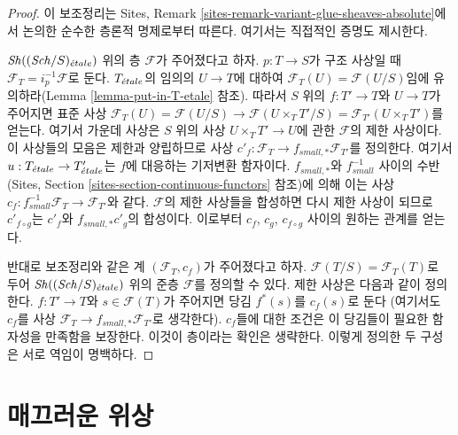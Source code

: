 \begin{proof}
이 보조정리는 Sites, Remark
\ref{sites-remark-variant-glue-sheaves-absolute}에서 논의한 순수한 층론적
명제로부터 따른다. 여기서는 직접적인 증명도 제시한다.

\medskip\noindent
$\mathop{\mathit{Sh}}\nolimits((\mathit{Sch}/S)_{\acute{e}tale})$ 위의 층 $\mathcal{F}$가 주어졌다고 하자.
$p : T \to S$가 구조 사상일 때 $\mathcal{F}_T = i_p^{-1}\mathcal{F}$로
둔다. $T_{\acute{e}tale}$의 임의의 $U \to T$에 대하여
$\mathcal{F}_T(U) = \mathcal{F}(U/S)$임에 유의하라(Lemma
\ref{lemma-put-in-T-etale} 참조). 따라서 $S$ 위의 $f : T' \to T$와
$U \to T$가 주어지면 표준 사상
$\mathcal{F}_T(U) = \mathcal{F}(U/S) \to \mathcal{F}(U \times_T T'/S)
= \mathcal{F}_{T'}(U \times_T T')$를 얻는다. 여기서 가운데 사상은
$S$ 위의 사상 $U \times_T T' \to U$에 관한 $\mathcal{F}$의 제한
사상이다. 이 사상들의 모음은 제한과 양립하므로 사상
$c'_f : \mathcal{F}_T \to f_{small, *}\mathcal{F}_{T'}$를 정의한다.
여기서 $u : T_{\acute{e}tale} \to T'_{\acute{e}tale}$는 $f$에 대응하는 기저변환
함자이다. $f_{small, *}$와 $f_{small}^{-1}$ 사이의 수반(Sites,
Section \ref{sites-section-continuous-functors} 참조)에 의해 이는 사상
$c_f : f_{small}^{-1}\mathcal{F}_T \to \mathcal{F}_{T'}$와 같다.
$\mathcal{F}$의 제한 사상들을 합성하면 다시 제한 사상이 되므로
$c'_{f \circ g}$는 $c'_f$와 $f_{small, *}c'_g$의 합성이다. 이로부터
$c_f$, $c_g$, $c_{f \circ g}$ 사이의 원하는 관계를 얻는다.

\medskip\noindent
반대로 보조정리와 같은 계 $(\mathcal{F}_T, c_f)$가 주어졌다고 하자.
$\mathcal{F}(T/S) = \mathcal{F}_T(T)$로 두어
$\mathop{\mathit{Sh}}\nolimits((\mathit{Sch}/S)_{\acute{e}tale})$ 위의 준층 $\mathcal{F}$를 정의할 수 있다. 제한
사상은 다음과 같이 정의한다. $f : T' \to T$와
$s \in \mathcal{F}(T)$가 주어지면 당김 $f^*(s)$를 $c_f(s)$로 둔다
(여기서도 $c_f$를 사상
$\mathcal{F}_T \to f_{small, *}\mathcal{F}_{T'}$로 생각한다). $c_f$들에
대한 조건은 이 당김들이 필요한 함자성을 만족함을 보장한다. 이것이
층이라는 확인은 생략한다. 이렇게 정의한 두 구성은 서로 역임이
명백하다.
\end{proof}























\section{매끄러운 위상}
\label{section-smooth}

